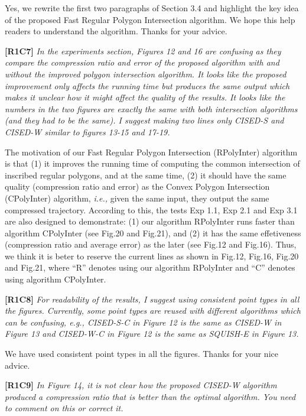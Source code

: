 \documentclass{letter}
\newcommand{\ie}{\emph{i.e.,}\xspace}
\begin{document}
Yes, we rewrite the first two paragraphs of Section 3.4 and highlight the key idea of the proposed Fast Regular Polygon Intersection algorithm. We hope this help readers to understand the algorithm. 
Thanks for your advice.

\textbf{[R1C7]} \emph{In the experiments section, Figures 12 and 16 are confusing as they compare the compression ratio and error of the proposed algorithm with and without the improved polygon intersection algorithm. It looks like the proposed improvement only affects the running time but produces the same output which makes it unclear how it might affect the quality of the results. It looks like the numbers in the two figures are exactly the same with both intersection algorithms (and they had to be the same). I suggest making two lines only CISED-S and CISED-W similar to figures 13-15 and 17-19.}

The motivation of our Fast Regular Polygon Intersection (RPolyInter) algorithm is that (1) it improves the running time of computing the common intersection of inscribed regular polygons, and at the same time, (2) it should have the same quality (compression ratio and error) as the Convex Polygon Intersection (CPolyInter) algorithm, \ie  given the same input, they output the same compressed trajectory.
According to this, the tests Exp 1.1, Exp 2.1 and Exp 3.1 are also designed to demonstrate: (1) our algorithm RPolyInter runs faster than algorithm CPolyInter (see Fig.20 and Fig.21), and (2) it has the same effetiveness (compression ratio and average error) as the later (see Fig.12 and Fig.16). 
%
Thus, we think it is beter to reserve the current lines as shown in Fig.12, Fig.16, Fig.20 and Fig.21, where ``R'' denotes using our algorithm RPolyInter and ``C'' denotes using algorithm CPolyInter.

\textbf{[R1C8]} \emph{For readability of the results, I suggest using consistent point types in all the figures. Currently, some point types are reused with different algorithms which can be confusing, e.g., CISED-S-C in Figure 12 is the same as CISED-W in Figure 13 and CISED-W-C in Figure 12 is the same as SQUISH-E in Figure 13.}

We have used consistent point types in all the figures. Thanks for your nice advice.

\textbf{[R1C9]} \emph{In Figure 14, it is not clear how the proposed CISED-W algorithm produced a compression ratio that is better than the optimal algorithm. You need to comment on this or correct it.}
\end{document}
